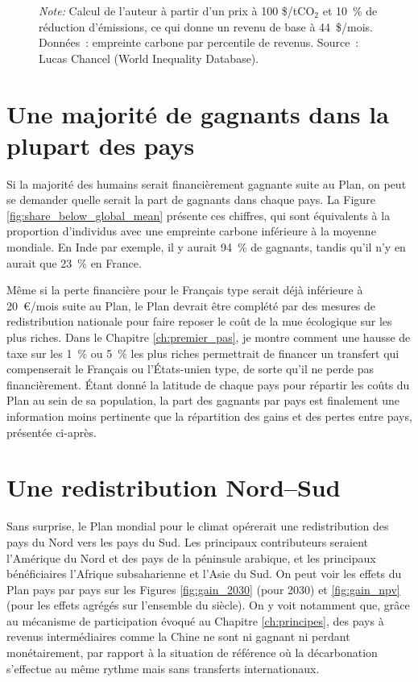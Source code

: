 \documentclass[a5paper,french,openany]{memoir}
\begin{document}
\begin{figure}[h!]
\begin{subfigure}{.5\textwidth}
\end{subfigure}
{\footnotesize \textit{Note:} Calcul de l'auteur à partir d'un prix à 100 \$/tCO$_\text{2}$ et 10~\% de réduction d'émissions, ce qui donne un revenu de base à 44~\$/mois. Données~: empreinte carbone par percentile de revenus. Source~: Lucas Chancel (World Inequality Database).}
\end{figure}

\section{Une majorité de gagnants dans la plupart des pays}

Si la majorité des humains serait financièrement gagnante suite au Plan, on peut se demander quelle serait la part de gagnants dans chaque pays. La Figure \ref{fig:share_below_global_mean} présente ces chiffres, qui sont équivalents à la proportion d'individus avec une empreinte carbone inférieure à la moyenne mondiale. En Inde par exemple, il y aurait 94~\% de gagnants, tandis qu'il n'y en aurait que 23~\% en France.  

Même si la perte financière pour le Français type serait déjà inférieure à 20~\euro{}/mois suite au Plan, le Plan devrait être complété par des mesures de redistribution nationale pour faire reposer le coût de la mue écologique sur les plus riches. Dans le Chapitre \ref{ch:premier_pas}, je montre comment une hausse de taxe sur les 1~\% ou 5~\% les plus riches permettrait de financer un transfert qui compenserait le Français ou l'États-unien type, de sorte qu'il ne perde pas financièrement. Étant donné la latitude de chaque pays pour répartir les coûts du Plan au sein de sa population, la part des gagnants par pays est finalement une information moins pertinente que la répartition des gains et des pertes entre pays, présentée ci-après.


\section{Une redistribution Nord--Sud}

Sans surprise, le Plan mondial pour le climat opérerait une redistribution des pays du Nord vers les pays du Sud. Les principaux contributeurs seraient l'Amérique du Nord et des pays de la péninsule arabique, et les principaux bénéficiaires l'Afrique subsaharienne et l'Asie du Sud. On peut voir les effets du Plan pays par pays sur les Figures \ref{fig:gain_2030} (pour 2030) et \ref{fig:gain_npv} (pour les effets agrégés sur l'ensemble du siècle). On y voit notamment que, grâce au mécanisme de participation évoqué au Chapitre \ref{ch:principes}, des pays à revenus intermédiaires comme la Chine ne sont ni gagnant ni perdant monétairement, par rapport à la situation de référence où la décarbonation s'effectue au même rythme mais sans transferts internationaux. 
\end{document}
